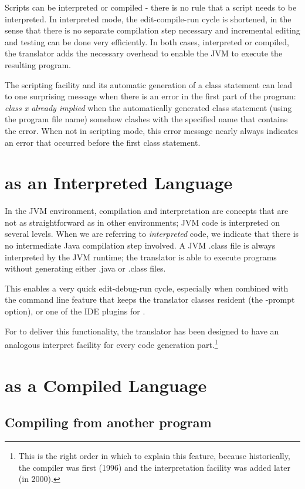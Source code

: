 {Scripts can be interpreted or compiled - there is no rule that a
script needs to be interpreted. In interpreted mode, the
edit-compile-run cycle is shortened, in the sense that there is no separate compilation
step necessary and incremental editing and testing can be done very efficiently. In both cases, interpreted or
compiled, the \nr{} translator adds the necessary overhead to enable
the JVM to execute the resulting program.
\begin{shaded}
The scripting facility and its automatic generation of a class
statement can lead to one surprising message when there is
an error in the first part of the program: \emph{class x already
  implied} when the automatically generated class statement (using the
program file name) somehow clashes with the specified name that
contains the error. When not in scripting mode, this error message
nearly always indicates an error that occurred before the first class statement.
\end{shaded}
\chapter{\nr{} as an Interpreted Language}\label{interpreted}
In the JVM environment, compilation and interpretation are concepts
that are not as straightforward as in other environments; JVM code is
interpreted on several levels. When we are referring to
\emph{interpreted} \nr{} code, we indicate that there is no
intermediate Java compilation step involved. A JVM .class file is
always interpreted by the JVM runtime; the \nr{} translator is able to
execute programs without generating either .java or .class files.

This enables a very quick edit-debug-run cycle, especially when
combined with the command line feature that keeps the translator
classes resident (the -prompt option), or one of the IDE plugins for
\nr{}.

For \nr{} to deliver this functionality, the translator has been
designed to have an analogous interpret facility for every code
generation part.\footnote{This is the right order in which to explain this
  feature, because historically, the compiler was first (1996) and the
  interpretation facility was added later (in 2000).}

\chapter{\nr{} as a Compiled Language}
\section{Compiling from another program}

}

